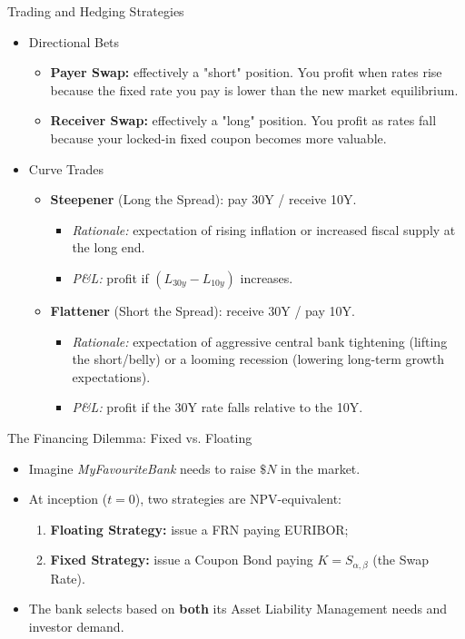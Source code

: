 \documentclass{beamer}
\begin{document}
\begin{frame}{Trading and Hedging Strategies}
	\begin{itemize}
		\item Directional Bets
		\begin{itemize}
			\item \textbf{Payer Swap:} effectively a "short" position. You profit when rates rise because the fixed rate you pay is lower than the new market equilibrium.
			\item \textbf{Receiver Swap:} effectively a "long" position. You profit as rates fall because your locked-in fixed coupon becomes more valuable.
		\end{itemize}

		\item Curve Trades
		\begin{itemize}
			\item \textbf{Steepener} (Long the Spread): pay 30Y / receive 10Y.
			\begin{itemize}
				\item \textit{Rationale:} expectation of rising inflation or increased fiscal supply at the long end.
				\item \textit{P\&L:} profit if $(L_{30y} - L_{10y})$ increases.
			\end{itemize}
			\item \textbf{Flattener} (Short the Spread): receive 30Y / pay 10Y.
			\begin{itemize}
				\item \textit{Rationale:} expectation of aggressive central bank tightening (lifting the short/belly) or a looming recession (lowering long-term growth expectations).
				\item \textit{P\&L:} profit if the 30Y rate falls relative to the 10Y.
			\end{itemize}
		\end{itemize}
	\end{itemize}
\end{frame}

\begin{frame}{The Financing Dilemma: Fixed vs. Floating}
	\begin{itemize}
		\item Imagine \textit{MyFavouriteBank} needs to raise $\$N$ in the market.
		\item At inception ($t=0$), two strategies are NPV-equivalent:
		\begin{enumerate}
			\item \textbf{Floating Strategy:} issue a FRN paying EURIBOR;
			\item \textbf{Fixed Strategy:} issue a Coupon Bond paying $K=S_{\alpha, \beta}$ (the Swap Rate).
		\end{enumerate}
		\item The bank selects based on \textbf{both} its \textcolor{maincolor}{Asset Liability Management} needs and investor demand.
	\end{itemize}
\end{frame}
\end{document}
